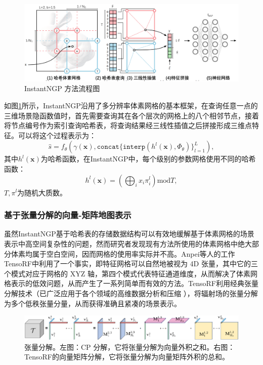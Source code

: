 \begin{figure}[ht]
    \centering
    \includegraphics[width=\textwidth]{undergraduate-thesis/images/related-work/instantngp.pdf}
    \caption{InstantNGP\cite{muller_instant_2022} 方法流程图}
    \label{fig:related-work instantngp}
\end{figure}

如图\ref{fig:related-work instantngp}所示，InstantNGP沿用了多分辨率体素网格的基本框架，在查询任意一点的三维场景隐函数值时，首先需要查询其在各个层次的网格上的八个相邻节点，接着将节点编号作为索引查询哈希表，将查询结果经三线性插值之后拼接形成三维点特征。可以将这个过程表示为：
\begin{equation}
    \hat{s} = f_\theta(\gamma(\mathbf{x}), \mathtt{concat}\{\mathtt{interp}(h^l(\mathbf{x}), \Phi_\theta)\}_{l=1}^L),
\end{equation}
其中$h^l(\mathbf{x})$为哈希函数，在InstantNGP中，每个级别的参数网格使用不同的哈希函数：
\begin{equation}
    h^l(\mathbf{x}) = \left(\bigoplus_{i}x_i\pi_i^l\right) \text{mod} T,
\end{equation}
$T, \pi^l$为随机大质数。

\subsubsection{基于张量分解的向量-矩阵地图表示}
虽然InstantNGP基于哈希表的存储数据结构可以有效地缓解基于体素网格的场景表示中高空间复杂性的问题，然而研究者发现现有方法所使用的体素网格中绝大部分体素均属于空白空间，因而网格的使用率实际并不高。Anpei等人\cite{chen_tensorf_2022}的工作TensoRF中利用了一个事实，即特征网格可以自然地被视为 4D 张量，其中它的三个模式对应于网格的 XYZ 轴，第四个模式代表特征通道维度，从而解决了体素网格表示的低效问题，从而产生了一系列简单而有效的方法。TensoRF利用经典张量分解技术（已广泛应用于各个领域的高维数据分析和压缩 \cite{kolda_tensor_2009}），将辐射场的张量分解为多个低秩张量分量，从而获得准确且紧凑的场景表示。

\begin{figure}[ht]
    \centering
    \includegraphics[width=\textwidth]{undergraduate-thesis/images/related-work/Tensor Decomp.png}
    \caption{张量分解\cite{chen_tensorf_2022}。左图：CP 分解，它将张量分解为向量外积之和。右图：TensoRF的向量矩阵分解，它将张量分解为向量矩阵外积的总和。}
    \label{fig:related-work tensor-decomp}
\end{figure}

